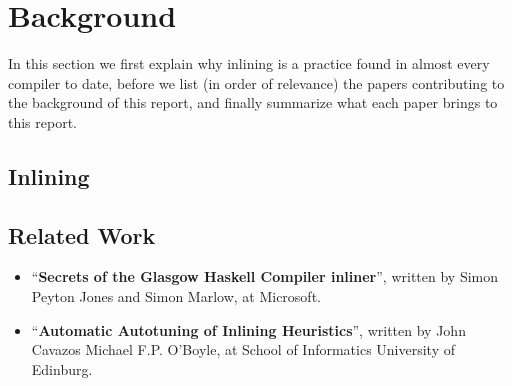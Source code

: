 \section{Background}

In this section we first explain why inlining is a practice found in almost
every compiler to date, before we list (in order of relevance) the
papers contributing to the background of this report, and finally summarize what
each paper brings to this report.

\subsection{Inlining}

\subsection{Related Work}


\begin{itemize}
	\item ``\textbf{Secrets of the Glasgow Haskell Compiler inliner}'', written
	by Simon Peyton Jones and Simon Marlow, at Microsoft. \\

	\item ``\textbf{Automatic Autotuning of Inlining Heuristics}'', written by John Cavazos  Michael F.P. O'Boyle, at School of Informatics University of
	Edinburg. \\

\end{itemize}
